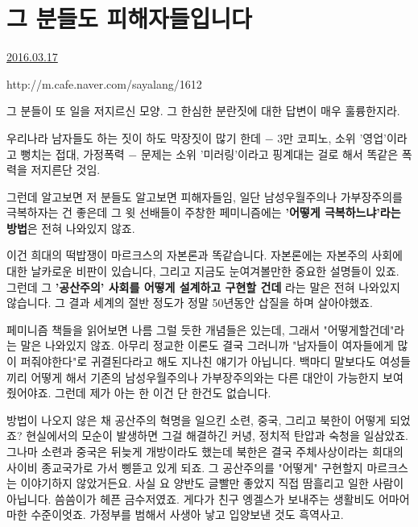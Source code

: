 \section{그 분들도 피해자들입니다}
\href{https://www.kockoc.com/Apoc/679752}{2016.03.17}

\vspace{5mm}

http://m.cafe.naver.com/sayalang/1612
\vspace{5mm}

그 분들이 또 일을 저지르신 모양.
그 한심한 분란짓에 대한 답변이 매우 훌륭한지라.
\vspace{5mm}

우리나라 남자들도 하는 짓이 하도 막장짓이 많기 한데
$-$ 3만 코피노, 소위 '영업'이라고 뻥치는 접대, 가정폭력 $-$
문제는 소위 '미러링'이라고 핑계대는 걸로 해서 똑같은 폭력을 저지른단 것임.
\vspace{5mm}

그런데 알고보면 저 분들도 알고보면 피해자들임,
일단 남성우월주의나 가부장주의를 극복하자는 건 좋은데
그 윗 선배들이 주창한 페미니즘에는 \textbf{'어떻게 극복하느냐'라는 방법}은 전혀 나와있지 않죠.
\vspace{5mm}

이건 희대의 떡밥쟁이 마르크스의 자본론과 똑같습니다.
자본론에는 자본주의 사회에 대한 날카로운 비판이 있습니다, 그리고 지금도 눈여겨볼만한 중요한 설명들이 있죠.
그런데 그 \textbf{'공산주의' 사회를 어떻게 설계하고 구현할 건데} 라는 말은 전혀 나와있지 않습니다.
그 결과 세계의 절반 정도가 정말 50년동안 삽질을 하며 살아야했죠.
\vspace{5mm}

페미니즘 책들을 읽어보면 나름 그럴 듯한 개념들은 있는데, 그래서 "어떻게할건데"라는 말은 나와있지 않죠.
아무리 정교한 이론도 결국 그러니까 "남자들이 여자들에게 많이 퍼줘야한다"로 귀결된다라고 해도 지나친 얘기가 아닙니다.
백마디 말보다도 여성들끼리 어떻게 해서 기존의 남성우월주의나 가부장주의와는 다른 대안이 가능한지 보여줬어야죠.
그런데 제가 아는 한 이건 단 한건도 없습니다.
\vspace{5mm}

방법이 나오지 않은 채 공산주의 혁명을 일으킨 소련, 중국, 그리고 북한이 어떻게 되었죠?
현실에서의 모순이 발생하면 그걸 해결하긴 커녕, 정치적 탄압과 숙청을 일삼았죠.
그나마 소련과 중국은 뒤늦게 개방이라도 했는데 북한은 결국 주체사상이라는 희대의 사이비 종교국가로 가서 삥뜯고 있게 되죠.
그 공산주의를 "어떻게" 구현할지 마르크스는 이야기하지 않았거든요.
사실 요 양반도 글빨만 좋았지 직접 땀흘리고 일한 사람이 아닙니다. 씀씀이가 헤픈 금수저였죠.
게다가 친구 엥겔스가 보내주는 생활비도 어마어마한 수준이엇죠. 가정부를 범해서 사생아 낳고 입양보낸 것도 흑역사고.
\vspace{5mm}

